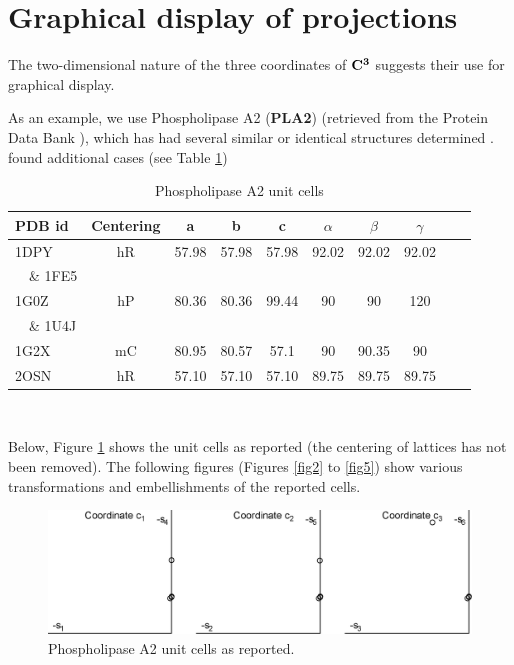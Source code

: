 \documentclass[]{iucr}              %
\numberwithin{equation}{section}
\newcommand{\CIII}[0]{$\bf{C^{3}}$}
\begin{document}
	
	\section{Graphical display of projections}
	
	The two-dimensional nature of the three coordinates of \CIII{} 
	suggests their use for graphical display. 
	
	As an example, we use Phospholipase A2 (\textbf{PLA2}) (retrieved from 
	the Protein Data Bank \cite{Bernstein1977}), which has had several similar
	or identical structures determined \cite{LeTrong2007}. 
	found additional cases (see Table \ref{PLA2})
	
	
	\begin{table}
		\begin{tabular}{m{} c c c c c c c c c}
			\toprule
			PDB id & Centering & a&b&c&$\alpha$&$\beta$&$\gamma$\\
			\midrule
			1DPY & hR& 57.98& 57.98& 57.98& 92.02& 92.02& 92.02\\
			~~\& 1FE5 \\
			1G0Z  & hP& 80.36& 80.36& 99.44& 90&    90&    120\\
			~~\& 1U4J\\
			1G2X & mC& 80.95& 80.57& 57.1 & 90&    90.35&  90\\
			2OSN & hR& 57.10& 57.10& 57.10& 89.75& 89.75&  89.75\\
			\bottomrule
		\end{tabular}	\\
		\caption{Phospholipase A2 unit cells}
		\label{PLA2}
	\end{table}
	
	Below, Figure \ref{fig1} shows the unit cells as 
	reported (the centering of lattices has not been removed).
	The following figures (Figures \ref{fig2} to \ref{fig5}) show various transformations and
	embellishments of the reported cells.
	
	\begin{figure}
		\includegraphics[width=1.0\textwidth]{1_35}
		\caption{Phospholipase A2 unit cells as reported. }
		\label{fig1}
	\end{figure}
	
\end{document}
